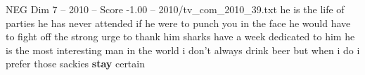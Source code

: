 \begin{textsample}{NEG Dim 7 – 2010 – Score -1.00 – 2010/tv\_com\_2010\_39.txt}  \label{ex:f7_neg_019}
he is the life of parties he has never attended if he were to punch you in the face he would have to fight off the strong urge to thank him sharks have a week dedicated to him he is the most interesting man in the world i don't always drink beer but when i do i prefer those sackies \textbf{stay} certain

\end{textsample}
